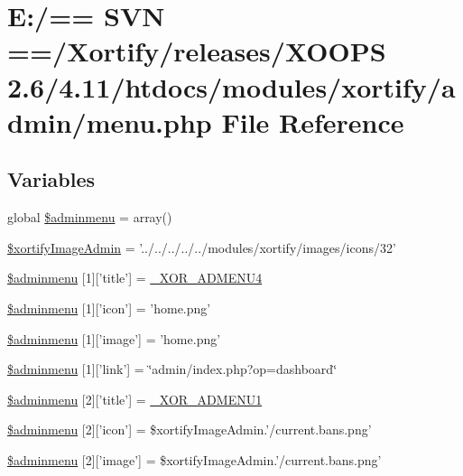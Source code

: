 \hypertarget{menu_8php}{\section{E\-:/== S\-V\-N ==/\-Xortify/releases/\-X\-O\-O\-P\-S 2.6/4.11/htdocs/modules/xortify/admin/menu.php File Reference}
\label{menu_8php}
}
\subsection*{Variables}
\begin{DoxyCompactItemize}
\item 
global \hyperlink{menu_8php_a9e95e7fdb7ca106c9d44e97430edef59}{\$adminmenu} = array()
\item 
\hyperlink{menu_8php_a3ab6c4c4d121f975136f6a49bda61104}{\$xortify\-Image\-Admin} = '../../../../../modules/xortify/images/icons/32'
\item 
\hyperlink{menu_8php_aa4d95e2b8402adb7aac22031a76bf8ac}{\$adminmenu} \mbox{[}1\mbox{]}\mbox{[}'title'\mbox{]} = \hyperlink{modinfo_8php_a2ba5306e6b6e5aebe055cd9805ee87a1}{\-\_\-\-X\-O\-R\-\_\-\-A\-D\-M\-E\-N\-U4}
\item 
\hyperlink{menu_8php_a2bfe17f3051123a62497c4f163a989be}{\$adminmenu} \mbox{[}1\mbox{]}\mbox{[}'icon'\mbox{]} = 'home.\-png'
\item 
\hyperlink{menu_8php_a874680199c4b14f5e8fb1123a3bf24b6}{\$adminmenu} \mbox{[}1\mbox{]}\mbox{[}'image'\mbox{]} = 'home.\-png'
\item 
\hyperlink{menu_8php_a8b18a24b489369490446d45ac2b617f7}{\$adminmenu} \mbox{[}1\mbox{]}\mbox{[}'link'\mbox{]} = \char`\"{}admin/index.\-php?op=dashboard\char`\"{}
\item 
\hyperlink{menu_8php_a0786c93d1375203e0020cc121fe02068}{\$adminmenu} \mbox{[}2\mbox{]}\mbox{[}'title'\mbox{]} = \hyperlink{modinfo_8php_aa1ec3ad910b652de032d02e89ef3b806}{\-\_\-\-X\-O\-R\-\_\-\-A\-D\-M\-E\-N\-U1}
\item 
\hyperlink{menu_8php_a0f5b9b0199b46370782c408755cad310}{\$adminmenu} \mbox{[}2\mbox{]}\mbox{[}'icon'\mbox{]} = \$xortify\-Image\-Admin.'/current.\-bans.\-png'
\item 
\hyperlink{menu_8php_ae2b4c511406ecfc8cb23eeba3cef2959}{\$adminmenu} \mbox{[}2\mbox{]}\mbox{[}'image'\mbox{]} = \$xortify\-Image\-Admin.'/current.\-bans.\-png'

\end{DoxyCompactItemize}

